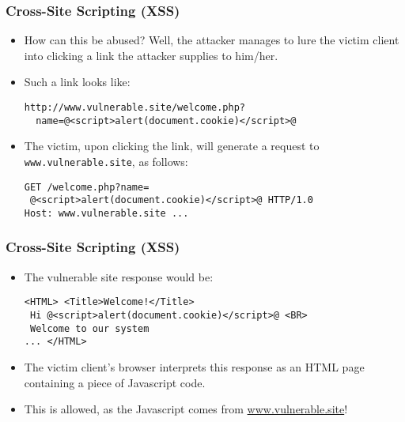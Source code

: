 \documentclass{beamer}
\begin{document}
\begin{frame}[fragile]
  \frametitle{Cross-Site Scripting (XSS) }

  \begin{itemize}
  \item How can this be abused? Well, the attacker manages to lure the
    victim client into clicking a link the attacker supplies to
    him/her.
  \item Such a link looks like:
\begin{lstlisting}[style=htmlCode]
http://www.vulnerable.site/welcome.php?
  name=@<script>alert(document.cookie)</script>@
\end{lstlisting}
  \item The victim, upon clicking the link, will generate a request to
    \lstinline{www.vulnerable.site}, as follows:
\begin{lstlisting}[style=htmlCode]
GET /welcome.php?name=
 @<script>alert(document.cookie)</script>@ HTTP/1.0
Host: www.vulnerable.site ...
\end{lstlisting}
\end{itemize}
\end{frame}

\begin{frame}[fragile]
  \frametitle{Cross-Site Scripting (XSS) }
  \begin{itemize}\itemsep=1ex
  \item The vulnerable site response would be:
\begin{lstlisting}[style=htmlCode]
<HTML> <Title>Welcome!</Title>
 Hi @<script>alert(document.cookie)</script>@ <BR>
 Welcome to our system
... </HTML>
\end{lstlisting}
\item The victim client's browser interprets this response as an HTML
  page containing a piece of Javascript code.
\item This is allowed, as the Javascript comes from
  \url{www.vulnerable.site}!
  \end{itemize}
\end{frame}
\end{document}
